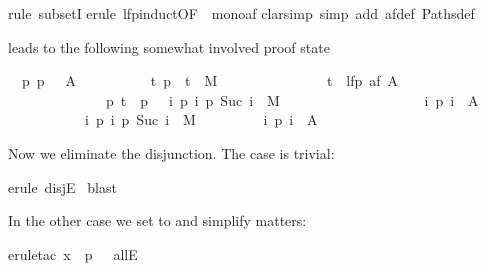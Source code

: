 \begin{isabellebody}
rule\ subsetI{\isacharparenright}\isanewline
{}erule\ lfp{\isacharunderscore}induct{\isacharbrackleft}OF\ {\isacharunderscore}\ mono{\isacharunderscore}af{\isacharbrackright}{\isacharparenright}\isanewline
{}clarsimp\ simp\ add{\isacharcolon}\ af{\isacharunderscore}def\ Paths{\isacharunderscore}def{\isacharparenright}%
\begin{isamarkuptxt}%
\noindent
leads to the following somewhat involved proof state
\begin{isabelle}
\ \ {\isasymAnd}p{\isachardot}\ {\isasymlbrakk}p\ \ {\isasymin}\ A\ {\isasymor}\isanewline
\ \ \ \ \ \ \ \ \ {\isacharparenleft}{\isasymforall}t{\isachardot}\ {\isacharparenleft}p\ \ t{\isacharparenright}\ {\isasymin}\ M\ {\isasymlongrightarrow}\isanewline
\ \ \ \ \ \ \ \ \ \ \ \ \ \ t\ {\isasymin}\ lfp\ {\isacharparenleft}af\ A{\isacharparenright}\ {\isasymand}\isanewline
\ \ \ \ \ \ \ \ \ \ \ \ \ \ {\isacharparenleft}{\isasymforall}p{\isachardot}\ t\ {\isacharequal}\ p\ \ {\isasymand}\ {\isacharparenleft}{\isasymforall}i{\isachardot}\ {\isacharparenleft}p\ i{\isacharcomma}\ p\ {\isacharparenleft}Suc\ i{\isacharparenright}{\isacharparenright}\ {\isasymin}\ M{\isacharparenright}\ {\isasymlongrightarrow}\isanewline
\ \ \ \ \ \ \ \ \ \ \ \ \ \ \ \ \ \ \ {\isacharparenleft}{\isasymexists}i{\isachardot}\ p\ i\ {\isasymin}\ A{\isacharparenright}{\isacharparenright}{\isacharparenright}{\isacharsemicolon}\isanewline
\ \ \ \ \ \ \ \ \ \ \ {\isasymforall}i{\isachardot}\ {\isacharparenleft}p\ i{\isacharcomma}\ p\ {\isacharparenleft}Suc\ i{\isacharparenright}{\isacharparenright}\ {\isasymin}\ M{\isasymrbrakk}\isanewline
\ \ \ \ \ \ \ \ {\isasymLongrightarrow}\ {\isasymexists}i{\isachardot}\ p\ i\ {\isasymin}\ A
\end{isabelle}
Now we eliminate the disjunction. The case  is trivial:%
\end{isamarkuptxt}%
erule\ disjE{\isacharparenright}\isanewline
\ blast{\isacharparenright}%
\begin{isamarkuptxt}%
\noindent
In the other case we set  to  and simplify matters:%
\end{isamarkuptxt}%
erule{\isacharunderscore}tac\ x\ {\isacharequal}\ {\isachardoublequote}p\ {}{\isachardoublequote}\ \ allE{\isacharparenright}\isanewline

\end{isabellebody}
